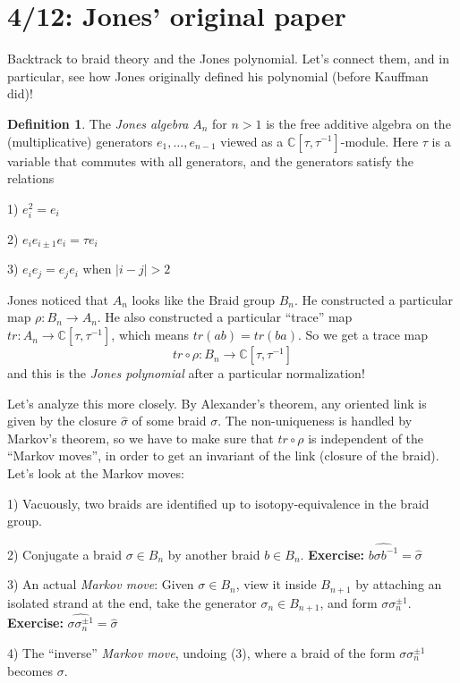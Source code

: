 \documentclass[11pt]{article}
\newcommand{\C}{\mathbb{C}}
\theoremstyle{plain}
\theoremstyle{definition}
\newtheorem{definition}{Definition}
\begin{document}
\clearpage
\section{4/12: Jones' original paper}

Backtrack to braid theory and the Jones polynomial. Let's connect them, and in particular, see how Jones originally defined his polynomial (before Kauffman did)!

\begin{definition}
The \textit{Jones algebra} $A_n$ for $n>1$ is the free additive algebra on the (multiplicative) generators $e_1,\ldots,e_{n-1}$ viewed as a $\C[\tau,\tau^{-1}]$-module. Here $\tau$ is a variable that commutes with all generators, and the generators satisfy the relations

1) $e_i^2=e_i$

2) $e_ie_{i\pm 1}e_i=\tau e_i$

3) $e_ie_j=e_je_i$ when $|i-j|>2$
\end{definition}

Jones noticed that $A_n$ looks like the Braid group $B_n$. He constructed a particular map $\rho:B_n\to A_n$. He also constructed a particular ``trace'' map $tr:A_n\to\C[\tau,\tau^{-1}]$, which means $tr(ab)=tr(ba)$. So we get a trace map
$$tr\circ\rho:B_n\to\C[\tau,\tau^{-1}]$$
and this is the \textit{Jones polynomial} after a particular normalization!

\bigskip
Let's analyze this more closely. By Alexander's theorem, any oriented link is given by the closure $\hat\sigma$ of some braid $\sigma$. The non-uniqueness is handled by Markov's theorem, so we have to make sure that $tr\circ\rho$ is independent of the ``Markov moves'', in order to get an invariant of the link (closure of the braid). Let's look at the Markov moves:

1) Vacuously, two braids are identified up to isotopy-equivalence in the braid group.

2) Conjugate a braid $\sigma\in B_n$ by another braid $b\in B_n$. \textbf{Exercise:} $\widehat{b\sigma b^{-1}}=\hat\sigma$

3) An actual \textit{Markov move}: Given $\sigma\in B_n$, view it inside $B_{n+1}$ by attaching an isolated strand at the end, take the generator $\sigma_n\in B_{n+1}$, and form $\sigma\sigma_n^{\pm 1}$. \textbf{Exercise:} $\widehat{\sigma\sigma_n^{\pm 1}}=\hat\sigma$

4) The ``inverse'' \textit{Markov move}, undoing (3), where a braid of the form $\sigma\sigma_n^{\pm 1}$ becomes $\sigma$.
\end{document}
